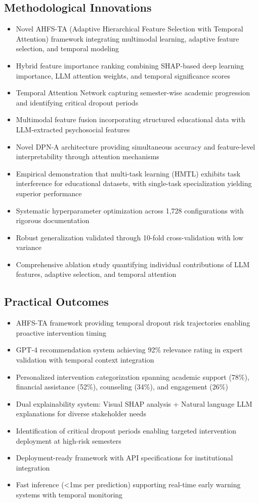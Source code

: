 \subsection{Methodological Innovations}
\begin{itemize}
\item Novel AHFS-TA (Adaptive Hierarchical Feature Selection with Temporal Attention) framework integrating multimodal learning, adaptive feature selection, and temporal modeling
\item Hybrid feature importance ranking combining SHAP-based deep learning importance, LLM attention weights, and temporal significance scores
\item Temporal Attention Network capturing semester-wise academic progression and identifying critical dropout periods
\item Multimodal feature fusion incorporating structured educational data with LLM-extracted psychosocial features
\item Novel DPN-A architecture providing simultaneous accuracy and feature-level interpretability through attention mechanisms
\item Empirical demonstration that multi-task learning (HMTL) exhibits task interference for educational datasets, with single-task specialization yielding superior performance
\item Systematic hyperparameter optimization across 1,728 configurations with rigorous documentation
\item Robust generalization validated through 10-fold cross-validation with low variance
\item Comprehensive ablation study quantifying individual contributions of LLM features, adaptive selection, and temporal attention
\end{itemize}

\subsection{Practical Outcomes}
\begin{itemize}
\item AHFS-TA framework providing temporal dropout risk trajectories enabling proactive intervention timing
\item GPT-4 recommendation system achieving 92\% relevance rating in expert validation with temporal context integration
\item Personalized intervention categorization spanning academic support (78\%), financial assistance (52\%), counseling (34\%), and engagement (26\%)
\item Dual explainability system: Visual SHAP analysis + Natural language LLM explanations for diverse stakeholder needs
\item Identification of critical dropout periods enabling targeted intervention deployment at high-risk semesters
\item Deployment-ready framework with API specifications for institutional integration
\item Fast inference (<1ms per prediction) supporting real-time early warning systems with temporal monitoring
\end{itemize}

